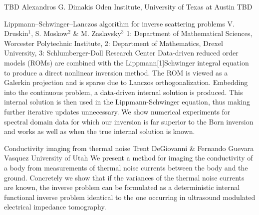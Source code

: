 \vspace{1.5ex}
\abs
{TBD}
{Alexandros G. Dimakis}
{Oden Institute, University of Texas at Austin}
{TBD}


\vspace{1.5ex}
\abs
{{L}ippmann--{S}chwinger--{L}anczos algorithm for inverse scattering problems}
{V. Druskin$^{1}$, S. Moskow$^{2}$ \& M. Zaslavsky$^{3}$}
{1: Department of Mathematical Sciences, Worcester Polytechnic Institute, 2: Department of Mathematics, Drexel University, 3: Schlumberger-Doll Research Center}
{Data-driven reduced order models (ROMs) are combined with the Lippmann[1]Schwinger integral equation to produce a direct nonlinear inversion method. The ROM is viewed as a Galerkin projection and is sparse due to Lanczos orthogonalization. Embedding into the continuous problem, a data-driven internal solution is produced. This internal solution is then used in the Lippmann-Schwinger equation, thus making further iterative updates unnecessary. We show numerical experiments for spectral domain data for which our inversion is far superior to the Born inversion and works as well as when the true internal solution is known.}


\vspace{1.5ex}

\abs
{Conductivity imaging from thermal noise}
{Trent DeGiovanni \& Fernando Guevara Vasquez}
{University of Utah}
{We present a method for imaging the conductivity of a body from measurements of thermal noise currents between the body and the ground. Concretely we show that if the variances of the thermal noise currents are known, the inverse problem can be formulated as a deterministic internal functional inverse problem identical to the one occurring in ultrasound modulated electrical impedance tomography.}


